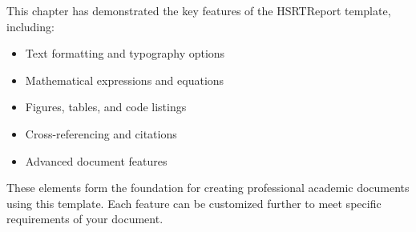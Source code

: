 This chapter has demonstrated the key features of the HSRTReport template,
including:

\begin{itemize}
	\item Text formatting and typography options
	\item Mathematical expressions and equations
	\item Figures, tables, and code listings
	\item Cross-referencing and citations
	\item Advanced document features
\end{itemize}

These elements form the foundation for creating professional academic documents
using this template. Each feature can be customized further to meet specific
requirements of your document.

